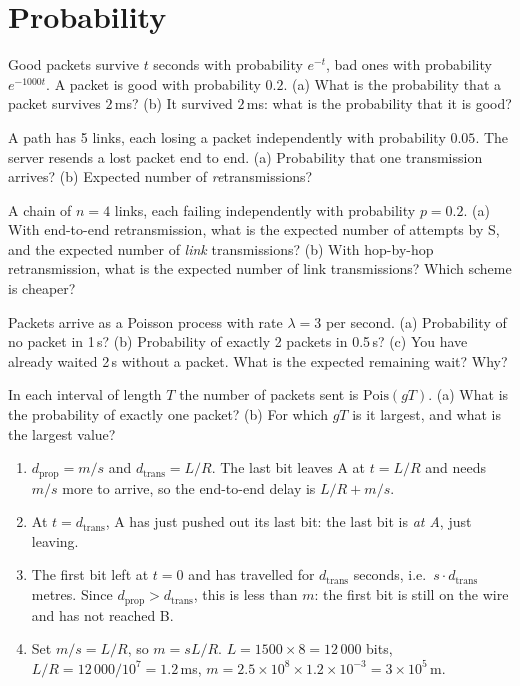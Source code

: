 \section{Probability}

Good packets survive $t$ seconds with probability $e^{-t}$, bad ones with probability $e^{-1000t}$. A packet is good with probability $0.2$.
(a) What is the probability that a packet survives $2$\,ms? (b) It survived $2$\,ms: what is the probability that it is good?

A path has 5 links, each losing a packet independently with probability $0.05$. The server resends a lost packet end to end.
(a) Probability that one transmission arrives? (b) Expected number of \emph{re}transmissions?

A chain of $n=4$ links, each failing independently with probability $p=0.2$.
(a) With end-to-end retransmission, what is the expected number of attempts by S, and the expected number of \emph{link} transmissions?
(b) With hop-by-hop retransmission, what is the expected number of link transmissions? Which scheme is cheaper?

Packets arrive as a Poisson process with rate $\lambda=3$ per second.
(a) Probability of no packet in 1\,s? (b) Probability of exactly 2 packets in 0.5\,s?
(c) You have already waited 2\,s without a packet. What is the expected remaining wait? Why?

In each interval of length $T$ the number of packets sent is $\text{Pois}(gT)$. (a) What is the probability of exactly one packet? (b) For which $gT$ is it largest, and what is the largest value?


\begin{enumerate}
  \item[(a)] $d_{\text{prop}}=m/s$ and $d_{\text{trans}}=L/R$. The last bit leaves A at $t=L/R$ and needs $m/s$ more to arrive, so the end-to-end delay is $L/R+m/s$.
  \item[(b)] At $t=d_{\text{trans}}$, A has just pushed out its last bit: the last bit is \emph{at A}, just leaving.
  \item[(c)] The first bit left at $t=0$ and has travelled for $d_{\text{trans}}$ seconds, i.e.\ $s\cdot d_{\text{trans}}$ metres. Since $d_{\text{prop}}>d_{\text{trans}}$, this is less than $m$: the first bit is still on the wire and has not reached B.
  \item[(d)] Set $m/s=L/R$, so $m=sL/R$. $L=1500\times8=12\,000$ bits, $L/R=12\,000/10^7=1.2$\,ms, $m=2.5\times10^8\times1.2\times10^{-3}=3\times10^5$\,m.
\end{enumerate}

